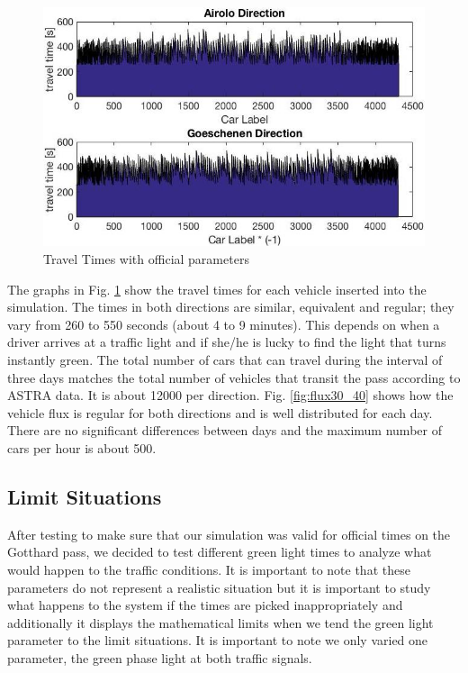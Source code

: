 \documentclass[11pt,a4paper,parskip=half-]{article}
\begin{document}
\begin{figure}[h!]
\includegraphics[scale=0.65]{travel_time_30:40}
\centering
\vspace*{-4mm}
\caption{Travel Times with official parameters}
\label{fig:traveltimes30_40}
\end{figure}
 
 
 

The graphs in Fig. \ref{fig:traveltimes30_40} show the travel times for each vehicle inserted into the simulation. The times in both directions are similar, equivalent and regular; they vary from 260 to 550 seconds (about 4 to 9 minutes). This depends on when a driver arrives at a traffic light and if she/he is lucky to find the light that turns instantly green. The total number of cars that can travel during the interval of three days matches the total number of vehicles that transit the pass according to ASTRA data. It is about 12000 per direction. Fig. \ref{fig:flux30_40} shows how the vehicle flux is regular for both directions and is well distributed for each day. There are no significant differences between days and the maximum number of cars per hour is about 500. 








\subsection{Limit Situations}
After testing to make sure that our simulation was valid for official times on the Gotthard pass, we decided to test different green light times to analyze what would happen to the traffic conditions. It is important to note that these parameters do not represent a realistic situation but it is important to study what happens to the system if the times are picked inappropriately and additionally it displays the mathematical limits when we tend the green light parameter to the limit situations. It is important to note we only varied one parameter, the green phase light at both traffic signals. 
\end{document}
